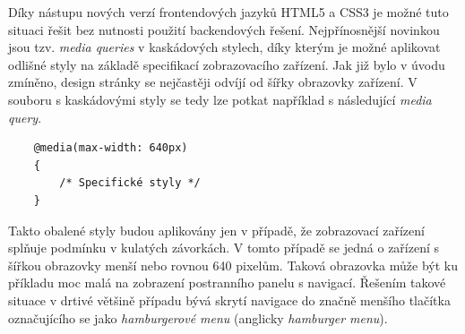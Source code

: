 Díky nástupu nových verzí frontendových jazyků HTML5 a CSS3 je možné tuto situaci řešit bez nutnosti použití backendových řešení. Nejpřínosnější novinkou jsou tzv. \emph{media queries} v kaskádových stylech, díky kterým je možné aplikovat odlišné styly na základě specifikací zobrazovacího zařízení. Jak již bylo v úvodu zmíněno, design stránky se nejčastěji odvíjí od šířky obrazovky zařízení. V souboru s kaskádovými styly se tedy lze potkat například s následující \emph{media query}.

\begin{verbatim}
    @media(max-width: 640px)
    {
        /* Specifické styly */
    }
\end{verbatim}

Takto obalené styly budou aplikovány jen v případě, že zobrazovací zařízení splňuje podmínku v kulatých závorkách. V tomto případě se jedná o zařízení s šířkou obrazovky menší nebo rovnou 640 pixelům. Taková obrazovka může být ku příkladu moc malá na zobrazení postranního panelu s navigací. Řešením takové situace v drtivé většině případu bývá skrytí navigace do značně menšího tlačítka označujícího se jako \emph{hamburgerové menu} (anglicky \emph{hamburger menu}).

